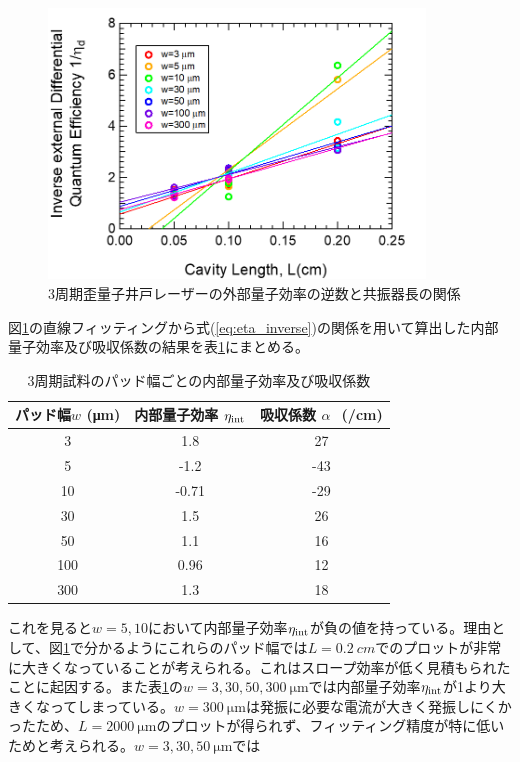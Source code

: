 {{\begin{figure}[h]
	\centering
	\includegraphics[width=10cm]{figure/fig_3_1_3QW_broadcontact_id_inverse_02.png}
	\caption{3周期歪量子井戸レーザーの外部量子効率の逆数と共振器長の関係}
	\label{fig:fig_3_1_3QW_broadcontact_id_inverse_02}
\end{figure}
図\ref{fig:fig_3_1_3QW_broadcontact_id_inverse_02}の直線フィッティングから式(\ref{eq:eta_inverse})の関係を用いて算出した内部量子効率及び吸収係数の結果を表\ref{table:table_3QW_i_int}にまとめる。
\begin{table}[h]
  \caption{3周期試料のパッド幅ごとの内部量子効率及び吸収係数}
  \label{table:table_3QW_i_int}
  \centering
  \begin{tabular}{ccc}
    \hline
    パッド幅$w$ (\si{\micro\metre})  &  内部量子効率 $\eta_{\rm{int}} $ &吸収係数 $\alpha\ $\ (/\si{cm}) \\
    \hline \hline
     3 & 1.8 & 27 \\
    5  & -1.2 & -43\\
    10  & -0.71 & -29\\ 
    30& 1.5& 26\\
    50& 1.1&16 \\
    100& 0.96& 12\\
    300&1.3 & 18\\
    \hline
  \end{tabular}
\end{table}


これを見ると$w=5, 10$において内部量子効率$\eta_{\rm{int}}$が負の値を持っている。理由として、図\ref{fig:fig_3_1_3QW_broadcontact_id_inverse_02}で分かるようにこれらのパッド幅では$L=0.2\ \si{cm}$でのプロットが非常に大きくなっていることが考えられる。これはスロープ効率が低く見積もられたことに起因する。また表\ref{table:table_3QW_i_int}の$w=3, 30, 50, 300\ \si{\micro\metre}$では内部量子効率$\eta_{\rm{int}}$が1より大きくなってしまっている。$w=300\ \si{\micro\metre}$は発振に必要な電流が大きく発振しにくかったため、$L=2000\ \si{\micro\metre}$のプロットが得られず、フィッティング精度が特に低いためと考えられる。$w=3, 30, 50\ \si{\micro\metre}$では

}}

